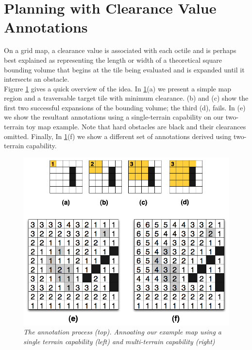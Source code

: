 \section{Planning with Clearance Value Annotations}
\label{aha:planningwithannotations}
On a grid map, a clearance value is associated with each octile and is perhaps best explained as representing the length or width of a theoretical square bounding volume that begins at the tile being evaluated and is expanded until it intersects an obstacle. \\
Figure \ref{aha-fig:annotations} gives a quick overview of the idea. In \ref{aha-fig:annotations}(a) we present a simple map region and a traversable target tile with minimum clearance. (b) and (c) show the first two successful expansions of the bounding volume; the third (d), fails. In (e) we show the resultant annotations using a single-terrain capability on our two-terrain toy map example. Note that hard obstacles are black and their clearances omitted. Finally, In \ref{aha-fig:annotations}(f) we show a different set of annotations derived using two-terrain capability.

\begin{figure}[htbp]
       \caption{\emph{The annotation process (top). Annoating our example map using a single terrain capability (left)  and multi-terrain capability (right) } }
       \begin{center}
                       \includegraphics[scale=0.25]{diagrams/annotations.png}
       \end{center}
       \label{aha-fig:annotations}
\end{figure}

